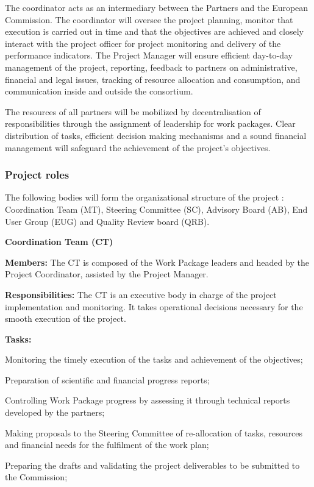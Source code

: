 The coordinator acts as an intermediary between the Partners and
the European Commission. The coordinator will oversee the project
planning, monitor that execution is carried out in time and that
the objectives are achieved and closely interact with the project
officer for project monitoring and delivery of the performance
indicators.  The Project Manager will ensure  efficient day-to-day
management of the project, reporting, feedback to partners on
administrative, financial and legal issues, tracking of  resource
allocation and consumption, and communication inside and outside the
consortium.

The resources of all partners will be mobilized by decentralisation of
responsibilities through the assignment of leadership for work
packages. Clear distribution of tasks, efficient decision making
mechanisms and a sound financial management will safeguard the
achievement of the project’s objectives.

\subsubsection{Project roles}

The following bodies will form the organizational structure of the
\TheProject project : Coordination Team (MT), Steering Committee (SC),
Advisory Board (AB), End User Group (EUG) and Quality Review board
(QRB).


\noindent\textbf{Coordination Team (CT)}\norbeak\par
\textbf{Members:} The CT is composed of the Work Package leaders
and headed by the Project Coordinator, assisted by the Project
Manager.

\textbf{Responsibilities:} The CT is an executive body in charge of
the project implementation and monitoring.
It takes operational decisions necessary for the smooth execution of
the project.

\textbf{Tasks:}
\begin{compactenum} 
\item Monitoring the timely execution of the tasks and achievement of
  the objectives;
\item Preparation of scientific and financial progress reports;
\item Controlling Work Package progress by assessing it through technical
  reports developed by the partners;
\item Making proposals to the Steering Committee of re-allocation of
  tasks, resources and financial needs for the fulfilment of the work
  plan;
\item Preparing the drafts and validating the project deliverables to
  be submitted to the Commission; 
\end{compactenum} 

